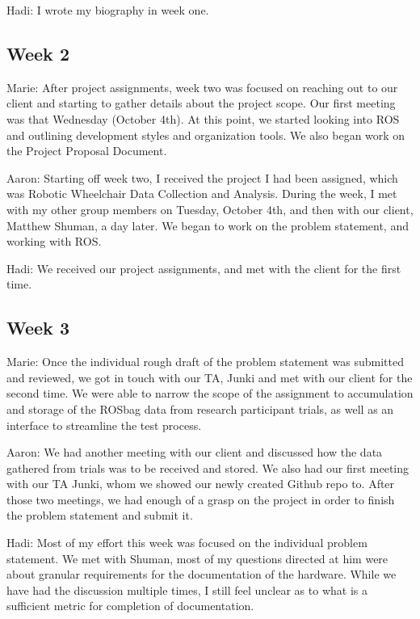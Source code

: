 \documentclass[onecolumn, draftclsnofoot,10pt, compsoc]{IEEEtran}
\begin{document}
Hadi: I wrote my biography in week one.\par

\subsection{Week 2}
Marie: After project assignments, week two was focused on reaching out to our client and starting to gather details about the project scope. Our first meeting was that Wednesday (October 4th). At this point, we started looking into ROS and outlining development styles and organization tools. We also began work on the Project Proposal Document.\par

Aaron: Starting off week two, I received the project I had been assigned, which was Robotic Wheelchair Data Collection and Analysis. During the week, I met with my other group members on Tuesday, October 4th, and then with our client, Matthew Shuman, a day later. We began to work on the problem statement, and working with ROS.\par

Hadi: We received our project assignments, and met with the client for the first time.

\subsection{Week 3}
Marie: Once the individual rough draft of the problem statement was submitted and reviewed, we got in touch with our TA, Junki and met with our client for the second time. We were able to narrow the scope of the assignment to accumulation and storage of the ROSbag data from research participant trials, as well as an interface to streamline the test process.\par

Aaron: We had another meeting with our client and discussed how the data gathered from trials was to be received and stored. We also had our first meeting with our TA Junki, whom we showed our newly created Github repo to. After those two meetings, we had enough of a grasp on the project in order to finish the problem statement and submit it.\par

Hadi: Most of my effort this week was focused on the individual problem statement. We met with Shuman, most of my questions directed at him were about granular requirements for the documentation of the hardware. While we have had the discussion multiple times, I still feel unclear as to what is a sufficient metric for completion of documentation. \par
\end{document}
